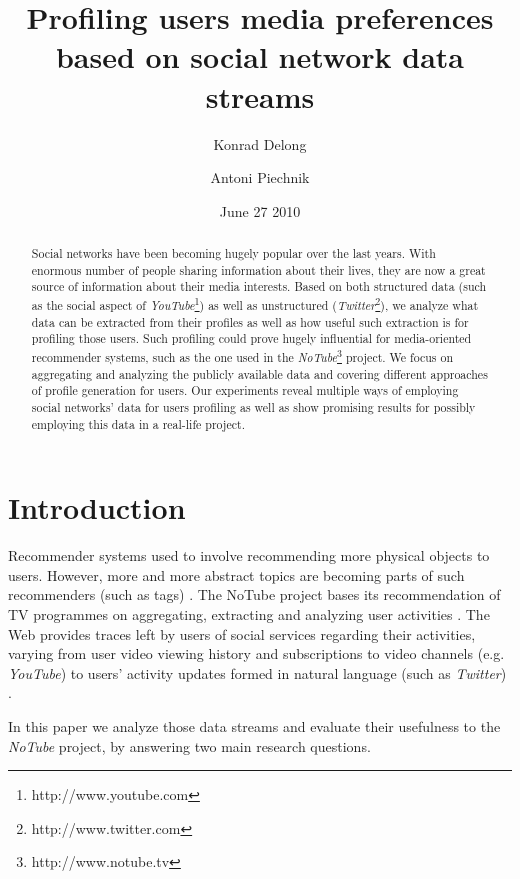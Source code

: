 \documentclass{article}
\begin{document}
\title{\textbf{Profiling users media preferences based on social network data streams}}
\author{Konrad Delong \and Antoni Piechnik}
\date{June 27 2010}

\maketitle

\begin{abstract} Social networks have been becoming hugely popular over the last
years. With enormous number of people sharing information about their lives,
they are now a great source of information about their media interests. Based on both
structured data (such as the social aspect of \textit{YouTube}\footnote[1]{http://www.youtube.com}) as well as unstructured
(\textit{Twitter}\footnote[2]{http://www.twitter.com}), we analyze what data can be extracted from their profiles as well as
how useful such extraction is for profiling those users. Such profiling could
prove hugely influential for media-oriented recommender systems, such as the one
used in the \textit{NoTube}\footnote[3]{http://www.notube.tv} project.
We focus on aggregating and analyzing the publicly available data and covering
different approaches of profile generation
for users. Our experiments reveal multiple ways of employing social networks'
data for users profiling as well as show promising results for possibly employing
this data in a real-life project.
\end{abstract}

\section{Introduction}

Recommender systems used to involve recommending more physical objects \cite{combining-cf-with-pa} to users.
However, more and more abstract topics are becoming parts of such recommenders (such as tags) \cite{accuracy-recommending}. The NoTube project bases its recommendation of TV programmes on aggregating,
extracting and analyzing user activities \cite{notube-main}. The Web provides traces left by users
of social services regarding their activities, varying from user video viewing history
and subscriptions to video channels (e.g. \textit{YouTube})
to users' activity updates formed in natural language (such as \textit{Twitter}) \cite{why-we-twitter}.

In this paper we analyze those data streams and evaluate their usefulness to the \textit{NoTube}
project, by answering two main research questions.
\end{document}
